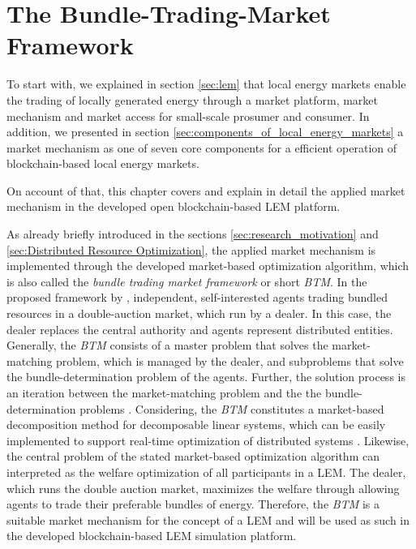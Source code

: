 \section{The Bundle-Trading-Market Framework}
\label{sec:btm}
To start with, we explained in section \ref{sec:lem} that local energy markets enable the trading 
of locally generated energy through a market platform, market mechanism and market access for 
small-scale prosumer and consumer. 
In addition, we presented in section \ref{sec:components_of_local_energy_markets} 
a market mechanism as one of seven core components for a efficient operation of blockchain-based
local energy markets.

On account of that, this chapter covers and explain in detail the applied market mechanism in the 
developed open blockchain-based LEM platform. 

As already briefly introduced in the sections \ref{sec:research_motivation} 
and \ref{sec:Distributed Resource Optimization}, the applied market mechanism is implemented 
through the developed market-based optimization algorithm, which is also called the 
\textit{bundle trading market framework} or short \textit{BTM}. 
In the proposed framework by , independent, self-interested
agents trading bundled resources in a double-auction market, which run by a dealer. 
In this case, the dealer replaces the central authority and agents represent distributed
entities. Generally, the \textit{BTM} consists of a master problem that solves 
the market-matching problem, which is managed by the dealer, 
and  subproblems that solve the bundle-determination problem of the agents.
Further, the solution process is an iteration between the market-matching problem and the 
the bundle-determination problems .
Considering, the \textit{BTM} constitutes a market-based decomposition method 
for decomposable linear systems,
which can be easily implemented to support real-time optimization 
of distributed systems .
Likewise, the central problem of the stated market-based optimization algorithm can 
interpreted as the welfare optimization of all participants in a LEM. 
The dealer, which runs the double auction market, maximizes the welfare through allowing 
agents to trade their preferable bundles of energy.
Therefore, the \textit{BTM} is a suitable market mechanism 
for the concept of a LEM and will be used as such in the developed blockchain-based LEM 
simulation platform. 

